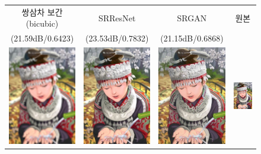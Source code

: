 \documentclass[10pt,twocolumn,letterpaper]{article}
\begin{document}
\begin{figure}[ht]
\begin{tabular}{cccc}
쌍삼차 보간(bicubic) &  SRResNet  & SRGAN & 원본\\
(21.59dB/0.6423) &   (23.53dB/0.7832) & (21.15dB/0.6868) & \\
\includegraphics[trim=0pt 0pt 0pt 0pt, clip, width=1.55in]{images/used/jpg/comic_SRF_4_bicubic} &
\includegraphics[trim=0pt 0pt 0pt 0pt, clip, width=1.55in]{images/used/jpg/comic_SRResNet-MSE} &
\includegraphics[trim=0pt 0pt 0pt 0pt, clip, width=1.55in]{images/used/jpg/comic_SRGAN-VGG54} &
\includegraphics[trim=0pt 0pt 0pt 0pt, clip, width=1.55in]{images/used/jpg/comic_HR.jpg} \\

\end{tabular}
\end{figure}
\end{document}

